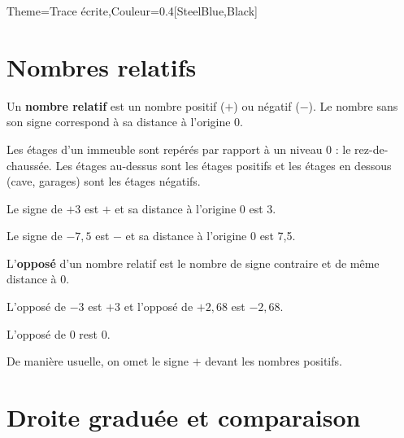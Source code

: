 \begin{Maquette}[Cours]{Theme={Trace écrite},Couleur={0.4[SteelBlue,Black]}}

   \section{Nombres relatifs}

      \begin{definition*}{}
         Un {\bf nombre relatif} est un nombre positif ($+$) ou négatif ($-$). Le nombre sans son signe correspond à sa distance à l'origine 0.
      \end{definition*}

      \begin{exemple*}{}
         Les étages d'un immeuble sont  repérés par rapport à un niveau 0 : le rez-de-chaussée. Les étages au-dessus sont les étages positifs et les étages en dessous (cave, garages) sont les étages négatifs.
      \end{exemple*}

      \begin{exemple*}{}
         Le signe de $+3$ est $+$ et sa distance à l'origine 0 est 3. \par
         Le signe de $-7,5$ est $-$ et sa distance à l'origine 0 est 7,5.  
      \end{exemple*}

      \begin{definition*}{}
         L'{\bf opposé} d'un nombre relatif est le nombre de signe contraire et de même	
      distance à 0.
      \end{definition*}

      \begin{exemple*}{}
         L'opposé de $-3$ est $+3$ et l'opposé de $+2,68$ est $-2,68$. \par
         L'opposé de 0 rest 0.
      \end{exemple*}

      De manière usuelle, on omet le signe \og $+$ \fg{} devant les nombres positifs.


   \section{Droite graduée et comparaison}


\end{Maquette}
